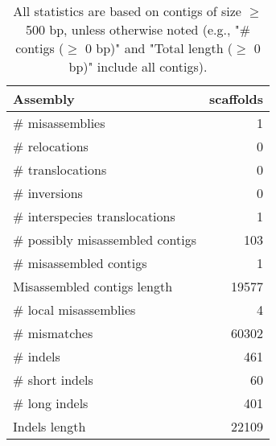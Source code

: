 \documentclass[12pt,a4paper]{article}
\begin{document}
\begin{table}[ht]
\begin{center}
\caption{All statistics are based on contigs of size $\geq$ 500 bp, unless otherwise noted (e.g., "\# contigs ($\geq$ 0 bp)" and "Total length ($\geq$ 0 bp)" include all contigs).}
\begin{tabular}{|l*{1}{|r}|}
\hline
Assembly & scaffolds \\ \hline
\# misassemblies & 1 \\ \hline
\hspace{5mm}\# relocations & 0 \\ \hline
\hspace{5mm}\# translocations & 0 \\ \hline
\hspace{5mm}\# inversions & 0 \\ \hline
\hspace{5mm}\# interspecies translocations & 1 \\ \hline
\# possibly misassembled contigs & 103 \\ \hline
\# misassembled contigs & 1 \\ \hline
Misassembled contigs length & 19577 \\ \hline
\# local misassemblies & 4 \\ \hline
\# mismatches & 60302 \\ \hline
\# indels & 461 \\ \hline
\hspace{5mm}\# short indels & 60 \\ \hline
\hspace{5mm}\# long indels & 401 \\ \hline
Indels length & 22109 \\ \hline
\end{tabular}
\end{center}
\end{table}
\end{document}
